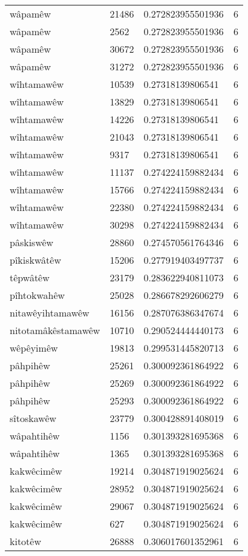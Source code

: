 \begin{longtable}{llll}
wâpamêw & 21486 & 0.272823955501936 & 6\\
wâpamêw & 2562 & 0.272823955501936 & 6\\
wâpamêw & 30672 & 0.272823955501936 & 6\\
wâpamêw & 31272 & 0.272823955501936 & 6\\
wîhtamawêw & 10539 & 0.27318139806541 & 6\\
wîhtamawêw & 13829 & 0.27318139806541 & 6\\
wîhtamawêw & 14226 & 0.27318139806541 & 6\\
wîhtamawêw & 21043 & 0.27318139806541 & 6\\
wîhtamawêw & 9317 & 0.27318139806541 & 6\\
wîhtamawêw & 11137 & 0.274224159882434 & 6\\
wîhtamawêw & 15766 & 0.274224159882434 & 6\\
wîhtamawêw & 22380 & 0.274224159882434 & 6\\
wîhtamawêw & 30298 & 0.274224159882434 & 6\\
pâskiswêw & 28860 & 0.274570561764346 & 6\\
pîkiskwâtêw & 15206 & 0.277919403497737 & 6\\
têpwâtêw & 23179 & 0.283622940811073 & 6\\
pîhtokwahêw & 25028 & 0.286678292606279 & 6\\
nitawêyihtamawêw & 16156 & 0.287076386347674 & 6\\
nitotamâkêstamawêw & 10710 & 0.290524444440173 & 6\\
wêpêyimêw & 19813 & 0.299531445820713 & 6\\
pâhpihêw & 25261 & 0.300092361864922 & 6\\
pâhpihêw & 25269 & 0.300092361864922 & 6\\
pâhpihêw & 25293 & 0.300092361864922 & 6\\
sîtoskawêw & 23779 & 0.300428891408019 & 6\\
wâpahtihêw & 1156 & 0.301393281695368 & 6\\
wâpahtihêw & 1365 & 0.301393281695368 & 6\\
kakwêcimêw & 19214 & 0.304871919025624 & 6\\
kakwêcimêw & 28952 & 0.304871919025624 & 6\\
kakwêcimêw & 29067 & 0.304871919025624 & 6\\
kakwêcimêw & 627 & 0.304871919025624 & 6\\
kitotêw & 26888 & 0.306017601352961 & 6\\

\end{longtable}
